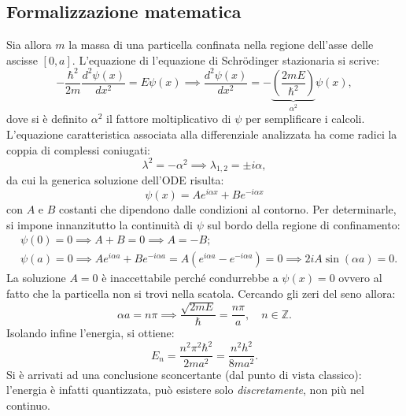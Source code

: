 \documentclass[a4paper,11pt]{report}
\begin{document}
\subsection{Formalizzazione matematica}
Sia allora $m$ la massa di una particella confinata nella regione dell'asse delle ascisse $[0,a]$. L'equazione di l'equazione di Schrödinger stazionaria si scrive:
\begin{equation}
   -\frac{\hbar^2}{2m}\frac{d^2\psi(x)}{d x^2} = E\psi(x) \implies \frac{d^2\psi(x)}{d x^2} = -\underbrace{\left( \frac{2mE}{\hbar^2} \right)}_{\alpha^2}\psi(x),
\end{equation}
dove si è definito $\alpha^2$ il fattore moltiplicativo di $\psi$ per semplificare i calcoli. L'equazione caratteristica associata alla differenziale analizzata ha come radici la coppia di complessi coniugati:
\begin{equation}
  \lambda^2 = -\alpha^2 \implies \lambda_{1,2} = \pm i\alpha,
\end{equation}
da cui la generica soluzione dell'ODE risulta:
\begin{equation}
\psi(x) = Ae^{i\alpha x} + Be^{-i\alpha x}
\end{equation}
con $A$ e $B$ costanti che dipendono dalle condizioni al contorno. Per determinarle, si impone innanzitutto la continuità di $\psi$ sul bordo della regione di confinamento:
\begin{equation}
\begin{aligned}
&\psi(0) = 0 \implies A+B = 0 \implies A = -B; \\
&\psi(a) = 0 \implies Ae^{i\alpha a} + Be^{-i\alpha a} = A(e^{i\alpha a} - e^{-i\alpha a}) = 0 \implies 2iA\sin(\alpha a) = 0.
\end{aligned}
\end{equation}
La soluzione $A = 0$ è inaccettabile perché condurrebbe a $\psi(x) = 0$ ovvero al fatto che la particella non si trovi nella scatola. Cercando gli zeri del seno allora:
\begin{equation}
\alpha a = n\pi \implies \frac{\sqrt{2mE}}{\hbar} = \frac{n\pi}{a}, \quad n\in \mathbb{Z}.
\label{eq:quant_a}
\end{equation}
Isolando infine l'energia, si ottiene:
\begin{equation}
E_n = \frac{n^2 \pi^2 \hbar^2}{2m a^2} = \frac{n^2h^2}{8ma^2}.
\end{equation}
Si è arrivati ad una conclusione sconcertante (dal punto di vista classico): l'energia è infatti quantizzata, può esistere solo \textit{discretamente}, non più nel continuo. 
\end{document}

